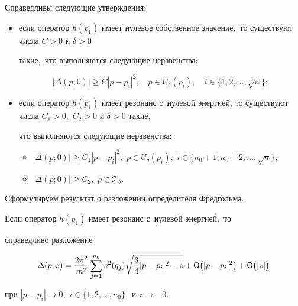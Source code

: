 \begin{theorem}[2]Справедливы следующие утверждения\/{\rm:}

\begin{itemize}

\item[{\rm а)}] если оператор $h(p_{1})$ имеет нулевое собственное значение$,$ то существуют числа $C>0$ и $\delta>0$

такие$,$ что выполняются следующие неравенства\/$:$

$$

|\Delta(p; 0)|\geq C |p-p_{i}|^2,\quad p\in U_\delta(p_{i}), \quad i\in \{1, 2, \dots, \sqrt{n}\};

$$



\item[{\rm б)}] если оператор $h(p_{1})$ имеет резонанс с~нулевой энергией, то существуют числа $C_1>0,$ $C_2>0$ и $\delta>0$ такие$,$

что выполняются следующие неравенства\/{\rm:}

\begin{itemize}

\item[{\rm 1)}] $ |\Delta(p; 0)|\geq C_1 |p-p_{i}|^2,$ $p\in U_\delta(p_{i}),$ $i\in\{n_0+1, n_0+2, \dots, \sqrt{n}\};$

\item[{\rm 2)}] $ |\Delta(p; 0)|\geq C_2,$ $p\in {\mathcal T}_\delta.$

\end{itemize}

\end{itemize}



\end{theorem}



\smallskip



Сформулируем результат о разложении определителя Фредгольма.

\hypertarget{ras2:thm:3}{\smallskip }

\begin{theorem}[3]Если оператор $h(p_{1})$ имеет резонанс с~нулевой энергией$,$ то

справедливо разложение

$$

\Delta(p ; z)=\frac{ 2 \pi^2 }{m^2} \sum\limits_{j=1}^{n_{0}} v^2(q_{j}) \sqrt{\frac{3}{4}|p-p_{i}|^2-z}+

{\sf O} \bigl(|p-p_{i}|^2\bigr)+ {\sf O}\bigl(|z|\bigr)

$$

при $|p-p_{i}|\to 0,$ $i\in \{1, 2, \dots, n_0\},$ и $z\to -0.$

\end{theorem}



